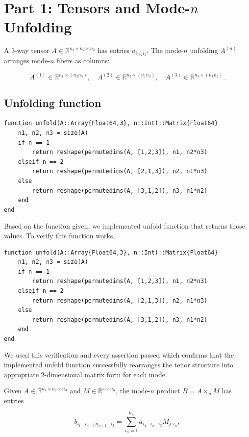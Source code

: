 \documentclass[11pt]{report}
\begin{document}
\section{Part 1: Tensors and Mode-\(n\) Unfolding}

A 3-way tensor \(A \in \mathbb{R}^{n_1 \times n_2 \times n_3}\) has entries \(a_{i_1 i_2 i_3}\).
The mode-\(n\) unfolding \(A^{(n)}\) arranges mode-\(n\) fibers as columns:


\[
A^{(1)} \in \mathbb{R}^{n_1 \times (n_2 n_3)},\quad
A^{(2)} \in \mathbb{R}^{n_2 \times (n_1 n_3)},\quad
A^{(3)} \in \mathbb{R}^{n_3 \times (n_1 n_2)}.
\]

\subsection{Unfolding function}

\begin{lstlisting}
function unfold(A::Array{Float64,3}, n::Int)::Matrix{Float64}
    n1, n2, n3 = size(A)
    if n == 1
        return reshape(permutedims(A, [1,2,3]), n1, n2*n3)
    elseif n == 2
        return reshape(permutedims(A, [2,1,3]), n2, n1*n3)
    else
        return reshape(permutedims(A, [3,1,2]), n3, n1*n2)
    end
end

\end{lstlisting}

Based on the function given, we implemented unfold function that returns those values. To verify this function works, 

\begin{lstlisting}
function unfold(A::Array{Float64,3}, n::Int)::Matrix{Float64}
    n1, n2, n3 = size(A)
    if n == 1
        return reshape(permutedims(A, [1,2,3]), n1, n2*n3)
    elseif n == 2
        return reshape(permutedims(A, [2,1,3]), n2, n1*n3)
    else
        return reshape(permutedims(A, [3,1,2]), n3, n1*n2)
    end
end

\end{lstlisting}

We used this verification and every assertion passed which confirms that the implemented unfold function successfully rearranges the tenor structure into appropriate 2-dimensional matrix form for each mode.



Given \(A \in \mathbb{R}^{n_1 \times n_2 \times n_3}\) and \(M \in \mathbb{R}^{s \times n_n}\), the mode-\(n\) product
\(B = A \times_n M\) has entries


\[
b_{i_1 \dots i_{n-1} j i_{n+1} \dots i_3}
= \sum_{i_n=1}^{n_n} a_{i_1 \dots i_n \dots i_3} M_{j,i_n},
\]
\end{document}

